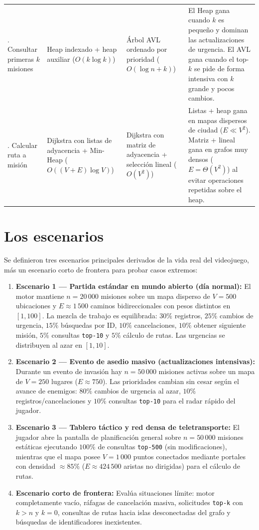 \documentclass[11pt,a4paper]{article}
\begin{document}
\begin{table}[htbp]
\begin{tabular}{p{2.6cm} p{3.1cm} p{3.1cm} p{5.2cm}}
\addlinespace
6. Consultar primeras $k$ misiones & Heap indexado + heap auxiliar ($O(k \log k)$) & Árbol AVL ordenado por prioridad ($O(\log n + k)$) & El Heap gana cuando $k$ es pequeño y dominan las actualizaciones de urgencia. El AVL gana cuando el top-$k$ se pide de forma intensiva con $k$ grande y pocos cambios. \\
\addlinespace
7. Calcular ruta a misión & Dijkstra con listas de adyacencia + Min-Heap ($O((V+E)\log V)$) & Dijkstra con matriz de adyacencia + selección lineal ($O(V^2)$) & Listas + heap gana en mapas dispersos de ciudad ($E \ll V^2$). Matriz + lineal gana en grafos muy densos ($E = \Theta(V^2)$) al evitar operaciones repetidas sobre el heap. \\
\bottomrule
\end{tabular}
\end{table}

\section{Los escenarios}

Se definieron tres escenarios principales derivados de la vida real del videojuego, más un escenario corto de frontera para probar casos extremos:

\begin{enumerate}
  \item \textbf{Escenario 1 --- Partida estándar en mundo abierto (día normal):} El motor mantiene $n = 20\,000$ misiones sobre un mapa disperso de $V = 500$ ubicaciones y $E \approx 1\,500$ caminos bidireccionales con pesos distintos en $[1, 100]$. La mezcla de trabajo es equilibrada: $30\%$ registros, $25\%$ cambios de urgencia, $15\%$ búsquedas por ID, $10\%$ cancelaciones, $10\%$ obtener siguiente misión, $5\%$ consultas \texttt{top-10} y $5\%$ cálculo de rutas. Las urgencias se distribuyen al azar en $[1, 10]$.
  \item \textbf{Escenario 2 --- Evento de asedio masivo (actualizaciones intensivas):} Durante un evento de invasión hay $n = 50\,000$ misiones activas sobre un mapa de $V = 250$ lugares ($E \approx 750$). Las prioridades cambian sin cesar según el avance de enemigos: $80\%$ cambios de urgencia al azar, $10\%$ registros/cancelaciones y $10\%$ consultas \texttt{top-10} para el radar rápido del jugador.
  \item \textbf{Escenario 3 --- Tablero táctico y red densa de teletransporte:} El jugador abre la pantalla de planificación general sobre $n = 50\,000$ misiones estáticas ejecutando $100\%$ de consultas \texttt{top-500} (sin modificaciones), mientras que el mapa posee $V = 1\,000$ puntos conectados mediante portales con densidad $\approx 85\%$ ($E \approx 424\,500$ aristas no dirigidas) para el cálculo de rutas.
  \item \textbf{Escenario corto de frontera:} Evalúa situaciones límite: motor completamente vacío, ráfagas de cancelación masiva, solicitudes \texttt{top-k} con $k > n$ y $k = 0$, consultas de rutas hacia islas desconectadas del grafo y búsquedas de identificadores inexistentes.
\end{enumerate}
\end{document}
